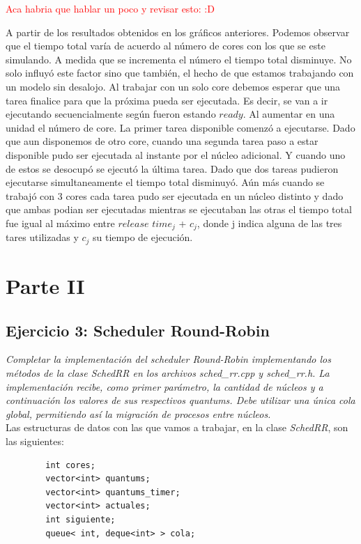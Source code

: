 \documentclass[a4paper]{article}
\begin{document}
\textcolor{red}{Aca habria que hablar un poco y revisar esto: :D}

A partir de los resultados obtenidos en los gráficos anteriores. Podemos observar que el tiempo total varía de acuerdo al número de cores con los que se este simulando. A medida que se incrementa el número el tiempo total disminuye. No solo influyó este factor sino que también, el hecho de que estamos trabajando con un modelo sin desalojo.  
Al trabajar con un solo core debemos esperar que una tarea finalice para que la próxima pueda ser ejecutada. Es decir, se van a ir ejecutando secuencialmente según fueron estando $ready$. \newline
Al aumentar en una unidad el número de core. La primer tarea disponible comenzó a ejecutarse. Dado que aun disponemos de otro core, cuando una segunda tarea paso a estar disponible pudo ser ejecutada al instante por el núcleo adicional. Y cuando uno de estos se desocupó se ejecutó la última tarea. Dado que dos tareas pudieron ejecutarse simultaneamente el tiempo total disminuyó. Aún más cuando se trabajó con 3 cores cada tarea pudo ser ejecutada en un núcleo distinto y dado que ambas podian ser ejecutadas mientras se ejecutaban las otras el tiempo total fue igual al máximo entre $release$ $time_j$ + $c_j$, donde j indica alguna de las tres tares utilizadas y $c_j$ su tiempo de ejecución.   
\newpage

\section{Parte II}


\subsection{Ejercicio 3: Scheduler Round-Robin}

\textit{Completar la implementaci\'on del scheduler Round-Robin implementando los m\'etodos de la clase SchedRR en los archivos sched_rr.cpp y sched_rr.h. La implementaci\'on recibe, como primer par\'ametro, la cantidad de n\'ucleos y a continuaci\'on los valores de sus respectivos quantums. Debe utilizar una \'unica cola global, permitiendo as\'i la migraci\'on de procesos entre n\'ucleos.}\\


Las estructuras de datos con las que vamos a trabajar, en la clase \emph{SchedRR}, son las siguientes:
	\begin{codesnippet}
	\begin{verbatim}
		int cores;
		vector<int> quantums;
		vector<int> quantums_timer;
		vector<int> actuales;
		int siguiente;
		queue< int, deque<int> > cola;
	\end{verbatim}
	\end{codesnippet}
	
\end{document}
